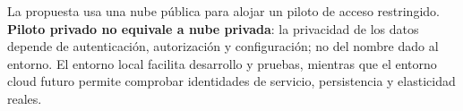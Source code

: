 La propuesta usa una nube pública para alojar un piloto de acceso restringido. \textbf{Piloto privado no equivale a nube privada}: la privacidad de los datos depende de autenticación, autorización y configuración; no del nombre dado al entorno. El entorno local facilita desarrollo y pruebas, mientras que el entorno cloud futuro permite comprobar identidades de servicio, persistencia y elasticidad reales.


